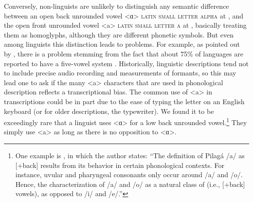 Conversely, non-linguists are unlikely to distinguish any semantic difference
between an open back unrounded vowel <ɑ> \textsc{latin small letter alpha} at
, and the open front unrounded vowel <a> \textsc{latin small letter a}
at , basically treating them as homoglyphs, although they are
different phonetic symbols. But even among linguists this distinction leads to
problems. For example, as pointed out by \citet{Mielke2009}, there is a problem
stemming from the fact that about 75\% of languages are reported to have a
five-vowel system \citep{Maddieson1984}. Historically, linguistic descriptions
tend not to include precise audio recording and measurements of formants, so
this may lead one to ask if the many <a> characters that are used in
phonological description reflects a transcriptional bias. The common use of <a>
in transcriptions could be in part due to the ease of typing the letter on an
English keyboard (or for older descriptions, the typewriter). We found it to be
exceedingly rare that a linguist uses <ɑ> for a low back unrounded
vowel.\footnote{One example is \citet[75]{Vidal2001a}, in which the author
states: ``The definition of Pilagá /a/ as [+back] results from its behavior in
certain phonological contexts. For instance, uvular and pharyngeal consonants
only occur around /a/ and /o/. Hence, the characterization of /a/ and /o/ as a
natural class of (i.e., [+back] vowels), as opposed to /i/ and /e/.''} They
simply use <a> as long as there is no opposition to <ɑ>.


